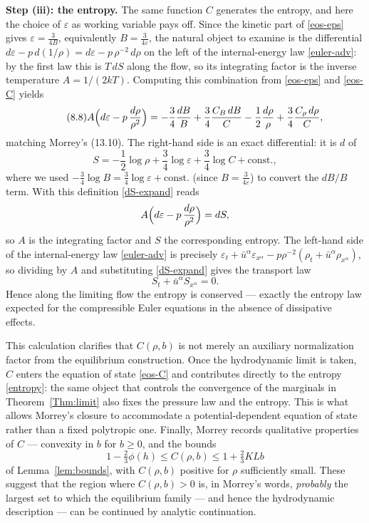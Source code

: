 \documentclass[11pt]{article}
\begin{document}
\medskip
\noindent\textbf{Step (iii): the entropy.}
The same function $C$ generates the entropy, and here the choice of $\varepsilon$ as working variable pays off. Since the kinetic part of \eqref{eos-eps} gives $\varepsilon=\tfrac{3}{4B}$, equivalently $B=\tfrac{3}{4\varepsilon}$, the natural object to examine is the differential $d\varepsilon-p\,d(1/\rho)=d\varepsilon-p\,\rho^{-2}\,d\rho$ on the left of the internal-energy law \eqref{euler-adv}: by the first law this is $T\,dS$ along the flow, so its integrating factor is the inverse temperature $A=1/(2kT)$. Computing this combination from \eqref{eos-eps} and \eqref{eos-C} yields
\begin{equation}\label{dS-expand}\tag{8.8}
A\Bigl(d\varepsilon - p\,\frac{d\rho}{\rho^2}\Bigr)
 = -\frac{3}{4}\frac{dB}{B}
   + \frac{3}{4}\frac{C_B\,dB}{C}
   - \frac{1}{2}\frac{d\rho}{\rho}
   + \frac{3}{4}\frac{C_\rho\,d\rho}{C},
\end{equation}
matching Morrey's (13.10). The right-hand side is an exact differential: it is $d$ of
\begin{equation}\label{entropy}\tag{8.9}
S = -\frac12 \log \rho + \frac34 \log \varepsilon + \frac34 \log C + \text{const.},
\end{equation}
where we used $-\tfrac34\log B=\tfrac34\log\varepsilon+\text{const.}$ (since $B=\tfrac{3}{4\varepsilon}$) to convert the $dB/B$ term. With this definition \eqref{dS-expand} reads
\[
A\Bigl(d\varepsilon - p\,\frac{d\rho}{\rho^2}\Bigr)=dS,
\]
so $A$ is the integrating factor and $S$ the corresponding entropy. The left-hand side of the internal-energy law \eqref{euler-adv} is precisely $\varepsilon_t+\bar u^\alpha\varepsilon_{x^\alpha}-p\rho^{-2}(\rho_t+\bar u^\alpha\rho_{x^\alpha})$, so dividing by $A$ and substituting \eqref{dS-expand} gives the transport law
\[
S_t + \bar u^\alpha S_{x^\alpha}=0.
\]
Hence along the limiting flow the entropy is conserved --- exactly the entropy law expected for the compressible Euler equations in the absence of dissipative effects.

This calculation clarifies that $C(\rho,b)$ is not merely an auxiliary normalization factor from the equilibrium construction. Once the hydrodynamic limit is taken, $C$ enters the equation of state \eqref{eos-C} and contributes directly to the entropy \eqref{entropy}: the same object that controls the convergence of the marginals in Theorem~\ref{Thm:limit} also fixes the pressure law and the entropy. This is what allows Morrey's closure to accommodate a potential-dependent equation of state rather than a fixed polytropic one. Finally, Morrey records qualitative properties of $C$ --- convexity in $b$ for $b\ge0$, and the bounds
\[
1-\tfrac{2}{3}\phi(h)\le C(\rho,b)\le 1+\tfrac{2}{3}KLb
\]
of Lemma~\ref{lem:bounds}, with $C(\rho,b)$ positive for $\rho$ sufficiently small. These suggest that the region where $C(\rho,b)>0$ is, in Morrey's words, \emph{probably} the largest set to which the equilibrium family --- and hence the hydrodynamic description --- can be continued by analytic continuation.
\end{document}
